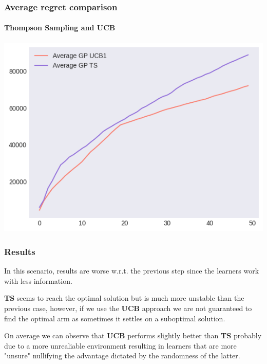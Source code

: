 
\begin{frame}[plain]

\frametitle{Average regret comparison}
\framesubtitle{Thompson Sampling and UCB}

\begin{center}
	\includegraphics[scale=0.5]{img/Graphs/uncertain_alpha_unit/image6.png}
\end{center}

\end{frame}


\begin{frame}

\frametitle{Results}

In this scenario, results are worse w.r.t. the previous step since the learners work with less information.

\textbf{TS} seems to reach the optimal solution but is much more unstable than the previous case, however, if we use the \textbf{UCB} approach we are not guaranteed to find the optimal arm as sometimes it settles on a suboptimal solution.

On average we can observe that \textbf{UCB} performs slightly better than \textbf{TS} probably due to a more unrealiable environment resulting in learners that are more "unsure" nullifying the advantage dictated by the randomness of the latter.

\end{frame}


